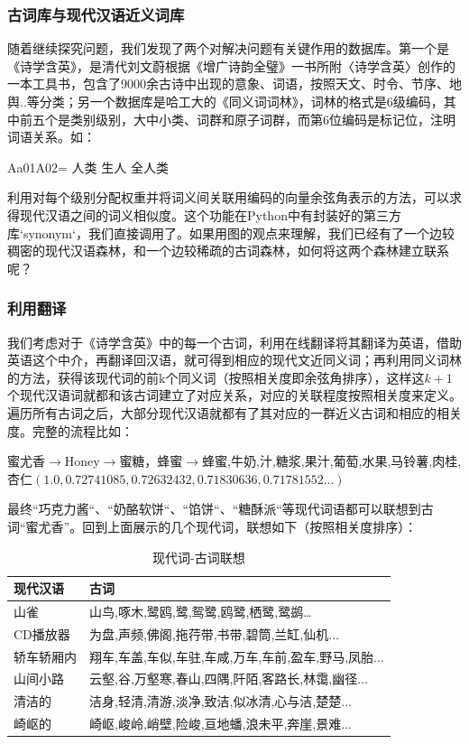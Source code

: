 \documentclass[a4paper, 10pt]{article}
\begin{document}
\subsubsection*{古词库与现代汉语近义词库}
随着继续探究问题，我们发现了两个对解决问题有关键作用的数据库。第一个是《诗学含英》，是清代刘文蔚根据《增广诗韵全璧》一书所附〈诗学含英〉创作的一本工具书，包含了9000余古诗中出现的意象、词语，按照天文、时令、节序、地舆..等分类；另一个数据库是哈工大的《同义词词林》，词林的格式是6级编码，其中前五个是类别级别，大中小类、词群和原子词群，而第6位编码是标记位，注明词语关系。如：
\begin{framed}
Aa01A02= 人类 生人 全人类
\end{framed}

利用对每个级别分配权重并将词义间关联用编码的向量余弦角表示的方法，可以求得现代汉语之间的词义相似度。这个功能在Python中有封装好的第三方库`synonym`，我们直接调用了。如果用图的观点来理解，我们已经有了一个边较稠密的现代汉语森林，和一个边较稀疏的古词森林，如何将这两个森林建立联系呢？

\subsubsection*{利用翻译}
我们考虑对于《诗学含英》中的每一个古词，利用在线翻译将其翻译为英语，借助英语这个中介，再翻译回汉语，就可得到相应的现代文近同义词；再利用同义词林的方法，获得该现代词的前k个同义词（按照相关度即余弦角排序），这样这$k+1$个现代汉语词就都和该古词建立了对应关系，对应的关联程度按照相关度来定义。遍历所有古词之后，大部分现代汉语就都有了其对应的一群近义古词和相应的相关度。完整的流程比如：

蜜尤香$\rightarrow$Honey$\rightarrow$蜜糖，蜂蜜$\rightarrow$蜂蜜,牛奶,汁,糖浆,果汁,葡萄,水果,马铃薯,肉桂, 杏仁$(1.0,0.72741085, 0.72632432, 0.71830636, 0.71781552...)$

最终“巧克力酱“、“奶酪软饼“、“馅饼“、“糖酥派“等现代词语都可以联想到古词“蜜尤香”。回到上面展示的几个现代词，联想如下（按照相关度排序）：

\begin{table}[H]
  \centering
  \caption{现代词-古词联想}
    \begin{tabular}{|l|l|}
    \hline
    现代汉语  & 古词 \\
    \hline
    山雀    & 山鸟,啄木,鹭鸥,鹭,鸳鹭,鸥鹭,栖鹭,鹭鹚… \\
    \hline
    CD播放器 & 为盘,声频,佛阁,拖荇带,书带,碧筒,兰缸,仙机... \\
    \hline
    轿车轿厢内 & 翔车,车盖,车似,车驻,车咸,万车,车前,盈车,野马,凤胎... \\
    \hline
    山间小路  & 云壑,谷,万壑寒,春山,四隅,阡陌,客路长,林霭,幽径... \\
    \hline
    清洁的   & 洁身,轻清,清游,淡净,致洁,似冰清,心与洁,楚楚... \\
    \hline
    崎岖的   & 崎岖,峻岭,峭壁,险峻,亘地蟠,浪未平,奔崖,景难... \\
    \hline
    \end{tabular}%
  \label{tab:addlabel}%
\end{table}%
\end{document}
